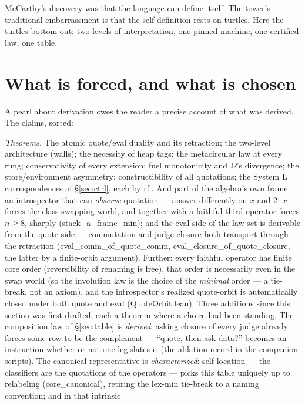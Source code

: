 \documentclass[acmsmall,screen,review]{acmart}
\begin{document}
McCarthy's discovery was that the language can define itself. The
tower's traditional embarrassment is that the self-definition rests
on turtles. Here the turtles bottom out: two levels of
interpretation, one pinned machine, one certified law, one table.

\section{What is forced, and what is chosen}
\label{sec:honest}

A pearl about derivation owes the reader a precise account of what
was derived. The claims, sorted:

\emph{Theorems.} The atomic quote/eval duality and its retraction;
the two-level architecture (walls); the necessity of heap tags; the
metacircular law at every rung; conservativity of every extension;
fuel monotonicity and $\Omega$'s divergence; the store/environment
asymmetry; constructibility of all quotations; the System L
correspondences of \S\ref{sec:ctrl}, each by \textsf{rfl}. And part
of the algebra's own frame: an introspector that can \emph{observe}
quotation --- answer differently on $x$ and $2 \cdot x$ --- forces
the class-swapping world, and together with a faithful third
operator forces $n \geq 8$, sharply
(\textsf{stack\_a\_frame\_min}); and the eval side of the law set is
derivable from the quote side --- commutation and judge-closure both
transport through the retraction
(\textsf{eval\_comm\_of\_quote\_comm},
\textsf{eval\_closure\_of\_quote\_closure}, the latter by a
finite-orbit argument). Further: every faithful operator has finite
core order (reversibility of renaming is free), that order is
necessarily even in the swap world (so the involution law is the
choice of the \emph{minimal} order --- a tie-break, not an axiom),
and the introspector's realized quote-orbit is automatically closed
under both quote and eval (\textsf{QuoteOrbit.lean}). Three
additions since this section was first drafted, each a theorem where
a choice had been standing. The composition law of \S\ref{sec:table}
is \emph{derived}: asking closure of every judge already forces some
row to be the complement --- ``quote, then ask \textsf{data?}''
becomes an instruction whether or not one legislates it (the
ablation record in the companion scripts). The canonical
representative is \emph{characterized}: self-location --- the
classifiers are the quotations of the operators --- picks this table
uniquely up to relabeling (\textsf{core\_canonical}), retiring the
lex-min tie-break to a naming convention; and in that intrinsic
\end{document}
